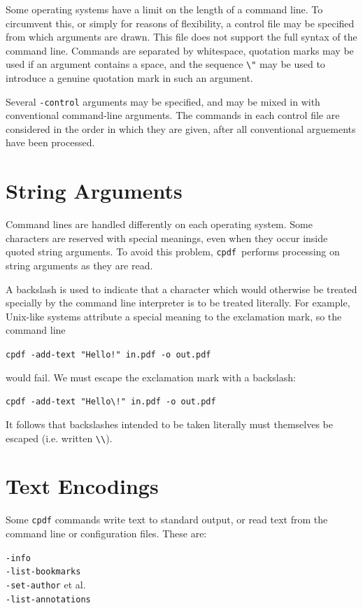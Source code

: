 \documentclass[a4paper,makeidx]{memoir}
\newcommand{\cpdf}{\texttt{cpdf}}
\begin{document}
Some operating systems have a limit on the length of a command line. To
circumvent this, or simply for reasons of flexibility, a control file may be
specified from which arguments are drawn. This file does not support the full
syntax of the command line. Commands are separated by whitespace, quotation
marks may be used if an argument contains a space, and the sequence \verb!\"!
may be used to introduce a genuine quotation mark in such an argument.

Several \verb!-control! arguments may be specified, and may be mixed in with
conventional command-line arguments. The commands in each control file are
considered in the order in which they are given, after all conventional
arguements have been processed.

\section{String Arguments}
Command lines are handled differently on each operating system. Some
characters are reserved with special meanings, even when they occur inside
quoted string arguments. To avoid this problem, \cpdf\ performs processing on
string arguments as they are read.

A backslash is used to indicate that a character which would otherwise be
treated specially by the command line interpreter is to be treated literally. For
example, Unix-like systems attribute a special meaning to the exclamation mark, so
the command line
\begin{framed}
 \small\verb?cpdf -add-text "Hello!" in.pdf -o out.pdf?
\end{framed}
\noindent would fail. We must escape the exclamation mark with a backslash:
\begin{framed}
 \small\verb?cpdf -add-text "Hello\!" in.pdf -o out.pdf?
\end{framed}
\noindent It follows that backslashes intended to be taken literally must themselves be
escaped (i.e. written \verb!\\!).

\section{Text Encodings}

Some \texttt{cpdf} commands write text to standard output, or read text from
the command line or configuration files. These are:

\begin{framed}
  \noindent\small\verb!-info!\\
  \noindent\small\verb!-list-bookmarks!\\
  \noindent\small\verb!-set-author! et al.\\
  \noindent\small\verb!-list-annotations!
\end{framed}
\end{document}
